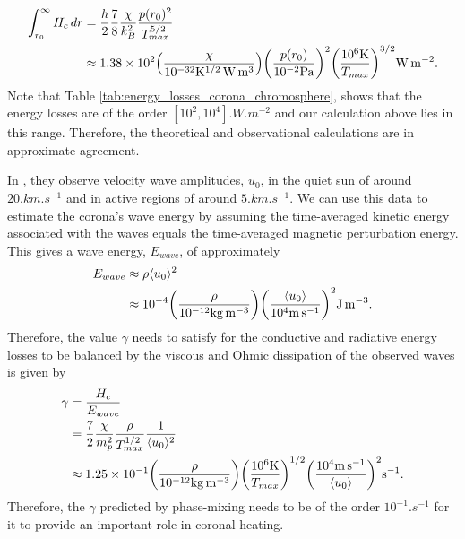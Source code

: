 \begin{equation}
    \begin{aligned}
    \int_{r_0}^\infty H_c \, dr &= \frac{h}{2}\frac{7}{8}\frac{\chi}{k_B^2}\frac{p(r_0)^2}{T_{max}^{5/2}} \\
    &\approx 1.38\times10^{2}\qty(\frac{\chi}{10^{-32}\si{.K^{1/2}.W.m^3}})\qty(\frac{p(r_0)}{10^{-2}\si{.Pa}})^2\qty(\frac{10^6\si{.K}}{T_{max}})^{3/2}\si{.W.m^{-2}}.
    \end{aligned}
\end{equation}
Note that Table \ref{tab:energy_losses_corona_chromosphere}, shows that the energy losses are of the order $[10^2,10^4]\si{.W.m^{-2}}$ and our calculation above lies in this range. Therefore, the theoretical and observational calculations are in approximate agreement. 

In \citet{McIntosh2011,McIntosh2012}, they observe velocity wave amplitudes, $u_0$, in the quiet sun of around $20\si{.km.s^{-1}}$ and in active regions of around $5\si{.km.s^{-1}}$. We can use this data to estimate the corona's wave energy by assuming the time-averaged kinetic energy associated with the waves equals the time-averaged magnetic perturbation energy. This gives a wave energy, $E_{wave}$, of approximately
\begin{equation}
    \label{eq:chap_3_observed_wave_energy}
    \begin{aligned}
    E_{wave} &\approx \rho \langle u_0 \rangle^2 \\
    &\approx10^{-4}\qty(\frac{\rho}{10^{-12}\si{.kg.m^{-3}}}) \qty(\frac{\langle u_0 \rangle}{10^4 \si{.m.s^{-1}}})^2\si{.J.m^{-3}}.
    \end{aligned}
\end{equation}
Therefore, the value $\gamma$ needs to satisfy for the conductive and radiative energy losses to be balanced by the viscous and Ohmic dissipation of the observed waves is given by
\begin{equation}
\label{eq:required_gamma}
\begin{aligned}
    \gamma &= \frac{H_c}{E_{wave}} \\
    &= \frac{7}{2}\frac{\chi}{m_p^2}\frac{\rho}{T_{max}^{1/2}}\frac{1}{\langle u_0\rangle^2} \\
    &\approx1.25\times10^{-1}\qty(\frac{\rho}{10^{-12}\si{.kg.m^{-3}}})\qty(\frac{10^6\si{.K}}{T_{max}})^{1/2}\qty(\frac{10^{4}\si{.m.s^{-1}}}{\langle u_0 \rangle})^2\si{.s^{-1}}.
\end{aligned}
\end{equation}
Therefore, the $\gamma$ predicted by phase-mixing needs to be of the order $10^{-1}\si{.s^{-1}}$ for it to provide an important role in coronal heating.


